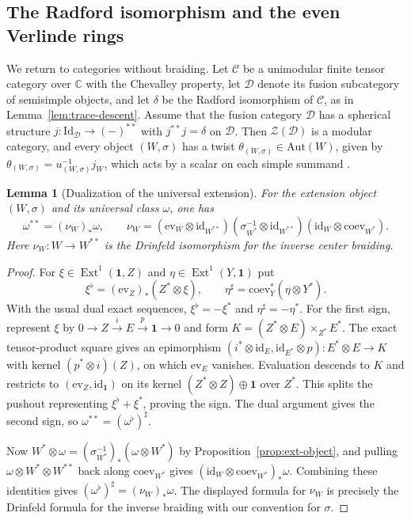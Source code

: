 \documentclass[11pt,reqno]{amsart}
\newtheorem{lemma}[theorem]{Lemma}
\theoremstyle{definition}
\newcommand{\Ext}{\operatorname{Ext}}
\newcommand{\one}{\mathbf 1}
\newcommand{\C}{\mathcal C}
\newcommand{\CC}{\mathbb C}
\begin{document}
\subsection{The Radford isomorphism and the even Verlinde rings}\label{sec:verlinde}
We return to categories without braiding. Let $\C$ be a unimodular finite tensor category over $\CC$ with the Chevalley property, let $\mathcal D$ denote its fusion subcategory of semisimple objects, and let $\delta$ be the Radford isomorphism of $\C$, as in Lemma~\ref{lem:trace-descent}. Assume that the fusion category $\mathcal D$ has a spherical structure $j:\mathrm{Id}_{\mathcal D}\to(-)^{**}$ with $j^{**}j=\delta$ on $\mathcal D$. Then $\mathcal Z(\mathcal D)$ is a modular category, and every object $(W,\sigma)$ has a twist $\theta_{(W,\sigma)}\in\mathrm{Aut}(W)$, given by $\theta_{(W,\sigma)}=u_{(W,\sigma)}^{-1}j_W$, which acts by a scalar on each simple summand \cite[\S\S8.10 and~8.20]{EGNO}.

\begin{lemma}[Dualization of the universal extension]\label{lem:extension-dual}
For the extension object $(W,\sigma)$ and its universal class $\omega$, one has
\[
 \omega^{**}=(\nu_W)_*\omega,\qquad
 \nu_W=(\mathrm{ev}_W\otimes\mathrm{id}_{W^{**}})
 (\sigma_{W^*}^{-1}\otimes\mathrm{id}_{W^{**}})
 (\mathrm{id}_W\otimes\mathrm{coev}_{W^*}).
\]
Here $\nu_W:W\to W^{**}$ is the Drinfeld isomorphism for the inverse center braiding.
\end{lemma}
\begin{proof}
For $\xi\in\Ext^1(\one,Z)$ and $\eta\in\Ext^1(Y,\one)$ put
\[
 \xi^\flat=(\mathrm{ev}_Z)_*(Z^*\otimes\xi),\qquad
 \eta^\sharp=\mathrm{coev}_Y^*(\eta\otimes Y^*).
\]
With the usual dual exact sequences, $\xi^\flat=-\xi^*$ and $\eta^\sharp=-\eta^*$. For the first sign, represent $\xi$ by $0\to Z\xrightarrow{i}E\xrightarrow{p}\one\to0$ and form $K=(Z^*\otimes E)\times_{Z^*}E^*$. The exact tensor-product square gives an epimorphism
$(i^*\otimes\mathrm{id}_E,\mathrm{id}_{E^*}\otimes p):E^*\otimes E\to K$
with kernel $(p^*\otimes i)(Z)$, on which $\mathrm{ev}_E$ vanishes. Evaluation descends to $K$ and restricts to $(\mathrm{ev}_Z,\mathrm{id}_\one)$ on its kernel $(Z^*\otimes Z)\oplus\one$ over $Z^*$. This splits the pushout representing $\xi^\flat+\xi^*$, proving the sign. The dual argument gives the second sign, so $\omega^{**}=(\omega^\flat)^\sharp$.

Now $W^*\otimes\omega=(\sigma_{W^*}^{-1})_*(\omega\otimes W^*)$ by Proposition~\ref{prop:ext-object}, and pulling $\omega\otimes W^*\otimes W^{**}$ back along $\mathrm{coev}_{W^*}$ gives $(\mathrm{id}_W\otimes\mathrm{coev}_{W^*})_*\omega$. Combining these identities gives $(\omega^\flat)^\sharp=(\nu_W)_*\omega$. The displayed formula for $\nu_W$ is precisely the Drinfeld formula for the inverse braiding with our convention for $\sigma$.
\end{proof}
\end{document}
